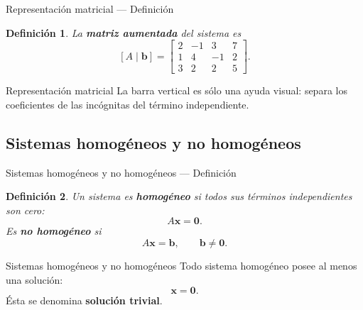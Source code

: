 \documentclass[aspectratio=169,11pt]{beamer}
\newtheorem{definicion}{Definición}[section]
\theoremstyle{remark}
\begin{document}
\begin{frame}[shrink=5]{Representación matricial — Definición}
\footnotesize
\begin{definicion}
La \textbf{matriz aumentada} del sistema es
\[
[A\mid\mathbf b]=
\left[
\begin{array}{ccc|c}
2&-1&3&7\\
1&4&-1&2\\
3&2&2&5
\end{array}
\right].
\]
\end{definicion}
\end{frame}

\begin{frame}[allowframebreaks]{Representación matricial}
\footnotesize
La barra vertical es sólo una ayuda visual: separa los coeficientes de las incógnitas del término
independiente.
\end{frame}

\subsection*{Sistemas homogéneos y no homogéneos}
\begin{frame}[shrink=5]{Sistemas homogéneos y no homogéneos — Definición}
\footnotesize
\begin{definicion}
Un sistema es \textbf{homogéneo} si todos sus términos independientes son cero:
\[
A\mathbf{x}=\mathbf{0}.
\]
Es \textbf{no homogéneo} si
\[
A\mathbf{x}=\mathbf{b},\qquad \mathbf b\neq\mathbf0.
\]
\end{definicion}
\end{frame}

\begin{frame}[allowframebreaks]{Sistemas homogéneos y no homogéneos}
\footnotesize
Todo sistema homogéneo posee al menos una solución:
\[
\mathbf{x}=\mathbf0.
\]
Ésta se denomina \textbf{solución trivial}.
\end{frame}
\end{document}
